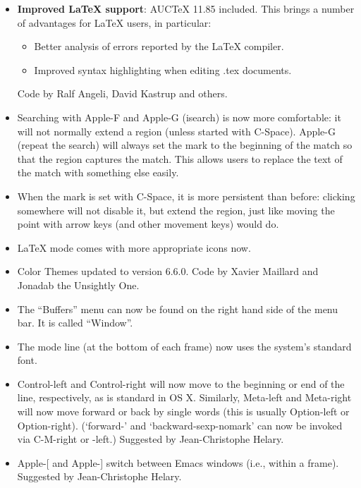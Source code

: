 \begin{itemize}
\item \textbf{Improved LaTeX support}: AUCTeX 11.85 included. This brings a number of advantages for LaTeX users, in particular:
\begin{itemize}
\item Better analysis of errors reported by the LaTeX compiler.
\item Improved syntax highlighting when editing .tex documents.
\end{itemize}
Code by Ralf Angeli, David Kastrup and others.

\item Searching with Apple-F and Apple-G (isearch) is now more
  comfortable: it will not normally extend a region (unless started
  with C-Space). Apple-G (repeat the search) will always set the mark
  to the beginning of the match so that the region captures the match.
  This allows users to replace the text of the match with something
  else easily.

\item When the mark is set with C-Space, it is more persistent than
  before: clicking somewhere will not disable it, but extend the
  region, just like moving the point with arrow keys (and other
  movement keys) would do.

\item LaTeX mode comes with more appropriate icons now.

\item Color Themes updated to version 6.6.0.
Code by Xavier Maillard and Jonadab the Unsightly One.

\item The ``Buffers'' menu can now be found on the right hand side of the menu bar.  It is called ``Window''.

\item The mode line (at the bottom of each frame) now uses the
  system's standard font.

\item Control-left and Control-right will now move to the beginning or
  end of the line, respectively, as is standard in OS X.  Similarly,
Meta-left and Meta-right will now move forward or back by single
words (this is usually Option-left or Option-right).  (`forward-'
and `backward-sexp-nomark' can now be invoked via C-M-right or -left.)
Suggested by Jean-Christophe Helary.

\item Apple-[ and Apple-] switch between Emacs windows (i.e., within a
  frame).
 Suggested by Jean-Christophe Helary.


\end{itemize}
